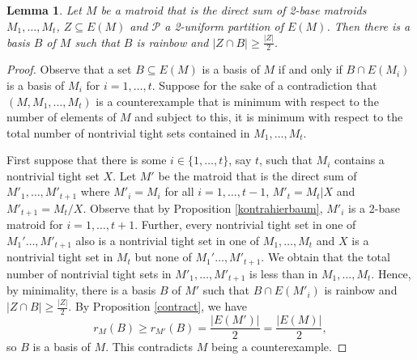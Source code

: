 \documentclass{article}
\newtheorem{Lemma}[Statement]{Lemma}
\begin{document}
\begin{Lemma}\label{main}
Let $M$ be a matroid that is the direct sum of 2-base matroids $M_1,\ldots,M_t$, $Z \subseteq E(M)$ and $\mathcal{P}$ a 2-uniform partition of $E(M)$. Then there is a basis $B$ of $M$ such that $B$ is rainbow and $|Z \cap B|\geq \frac{|Z|}{2}$.
\end{Lemma}
\begin{proof}
Observe that a set $B \subseteq E(M)$ is a basis of $M$ if and only if $B \cap E(M_i)$ is a basis of $M_i$ for $i=1,\ldots,t$.
Suppose for the sake of a contradiction that $(M,M_1,\ldots,M_t)$ is a counterexample that is minimum with respect to the number of elements of $M$  and subject to this, it is minimum with respect to the total number of nontrivial tight sets contained in $M_1,\ldots,M_t$. %

 First suppose that there is some $i\in \{1,\ldots,t\}$, say $t$, such that $M_i$ contains a nontrivial tight set $X$. Let $M'$ be the matroid that is the direct sum of $M'_1,\ldots,M'_{t+1}$ where $M'_i=M_i$ for all $i=1,\ldots,t-1$, $M'_t=M_t|X$ and $M'_{t+1}=M_t/X$. Observe that by Proposition \ref{kontrahierbaum}, $M'_i$ is a 2-base matroid for $i=1,\ldots,t+1$. Further, every nontrivial tight set in one of $M_1'\ldots,M'_{t+1}$ also is a nontrivial tight set in one of $M_1,\ldots,M_t$ and $X$ is a nontrivial tight set in $M_t$ but none of $M_1'\ldots,M'_{t+1}$. We obtain that the total number of nontrivial tight sets in $M'_1,\ldots,M'_{t+1}$ is less than in $M_1,\ldots,M_t$. Hence, by minimality, there is a basis $B$  of $M'$ such that $B \cap E(M'_i)$  is rainbow and $|Z \cap B|\geq \frac{|Z|}{2}$. By Proposition \ref{contract}, we have $$r_M(B)\geq r_{M'}(B)= \frac{|E(M')|}{2}=\frac{|E(M)|}{2},$$ so $B$ is a basis of $M$. This contradicts $M$ being a counterexample.


\end{proof}
\end{document}
